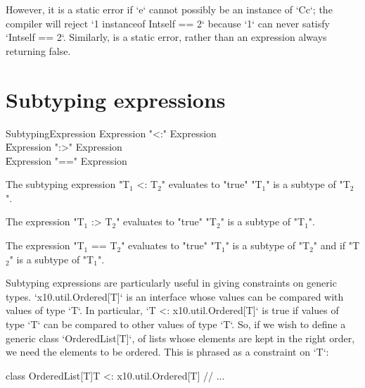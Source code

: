 However, it is a static error if \xcd`e` cannot possibly be an instance of
\xcd`C{c}`; the compiler will reject \xcd`1 instanceof Int{self == 2}` because
\xcd`1` can never satisfy \xcd`Int{self == 2}`. Similarly,  is a static error, rather than an expression always returning false. 


\section{Subtyping expressions}

\begin{grammar}
SubtypingExpression \: Expression \xcd"<:" Expression \\
                    \| Expression \xcd":>" Expression \\
                    \| Expression \xcd"==" Expression \\
\end{grammar}

The subtyping expression \xcdmath"T$_1$ <: T$_2$" evaluates to \xcd"true"
\xcdmath"T$_1$" is a subtype of \xcdmath"T$_2$".

The expression \xcdmath"T$_1$ :> T$_2$" evaluates to \xcd"true"
\xcdmath"T$_2$" is a subtype of \xcdmath"T$_1$".

The expression \xcdmath"T$_1$ == T$_2$"
evaluates to  \xcd"true" \xcdmath"T$_1$" is a subtype of \xcdmath"T$_2$" and
if \xcdmath"T$_2$" is a subtype of \xcdmath"T$_1$".

Subtyping expressions are particularly useful in giving constraints on generic
types.  \xcd`x10.util.Ordered[T]` is an interface whose values can be compared
with values of type \xcd`T`. 
In particular, \xcd`T <: x10.util.Ordered[T]` is
true if values of type \xcd`T` can be compared to other values of type
\xcd`T`.  So, if we wish to define a generic class \xcd`OrderedList[T]`, of
lists whose elements are kept in the right order, we need the elements to be
ordered.  This is phrased as a constraint on \xcd`T`: 
\begin{xten}
class OrderedList[T]{T <: x10.util.Ordered[T]} {
  // ...
}
\end{xten}
%





